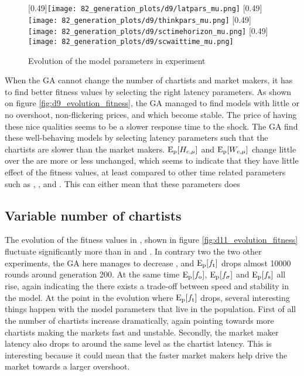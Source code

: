 \begin{figure}
	\centering
	[0.49\linewidth]{\texttt{[image: 82\_generation\_plots/d9/latpars\_mu.png]}}
	[0.49\linewidth]{\texttt{[image: 82\_generation\_plots/d9/thinkpars\_mu.png]}}
	[0.49\linewidth]{\texttt{[image: 82\_generation\_plots/d9/sctimehorizon\_mu.png]}}
	[0.49\linewidth]{\texttt{[image: 82\_generation\_plots/d9/scwaittime\_mu.png]}}
	\caption{Evolution of the model parameters in experiment \dten}
	\label{fig:d9_evolution_parameters}
\end{figure}

When the GA cannot change the number of chartists and market makers, it has to find better fitness values by selecting the right latency parameters. As shown on figure \ref{fig:d9_evolution_fitness}, the GA managed to find models with little or no overshoot, non-flickering prices, and which become stable. The price of having these nice qualities seems to be a slower response time to the shock. The GA find these well-behaving models by selecting latency parameters such that the chartists are slower than the market makers. $\mathrm{E}_\text{p}[H_{c, \mu}]$ and $\mathrm{E}_\text{p}[W_{c, \mu}]$ change little over the are more or less unchanged, which seems to indicate that they have little effect of the fitness values, at least compared to other time related parameters such as \sclatencymu, \ssmmlatencymu, \scthinkmu and \ssmmthinkmu. This can either mean that these parameters does


\subsection{Variable number of chartists}
The evolution of the fitness values in \deleven{}, shown in figure \ref{fig:d11_evolution_fitness} fluctuate significantly more than in \dnine{} and \dten{}. In contrary two the two other experiments, the GA here manages to decrease \timetoreachnewfundamental, and $\mathrm{E}_\text{p}[f_\text{t}]$ drops almost 10000 rounds around generation 200. At the same time $\mathrm{E}_\text{p}[f_\text{o}]$, $\mathrm{E}_\text{p}[f_\sigma]$ and $\mathrm{E}_\text{p}[f_\text{s}]$ all rise, again indicating the there exists a trade-off between speed and stability in the model. At the point in the evolution where $\mathrm{E}_\text{p}[f_\text{t}]$ drops, several interesting things happen with the model parameters that live in the population. First of all the number of chartists increase dramatically, again pointing towards more chartists making the markets fast and unstable. Secondly, the market maker latency also drops to around the same level as the chartist latency. This is interesting because it could mean that the faster market makers help drive the market towards a larger overshoot.

